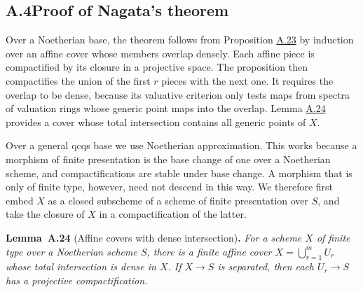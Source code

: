 \documentclass[11pt]{article}
\newenvironment{bpstatement}[2]{\par\addvspace{0.6\baselineskip}\noindent\textbf{#1}#2\textbf{.}\enspace\ignorespaces}
  {\par\addvspace{0.4\baselineskip}}
\newenvironment{bpstatementit}[2]{\begin{bpstatement}{#1}{#2}\itshape\ignorespaces}{\end{bpstatement}}
\begin{document}
\subsection*{\texorpdfstring{A.4\quad Proof of Nagata's theorem}{A.4 Proof of Nagata's theorem}}
\label{bp63}%
\label{bp64}%
Over a Noetherian base, the theorem follows from Proposition \hyperref[bp61]{A.23} by induction over an affine cover whose members overlap densely. Each affine piece is compactified by its closure in a projective space. The proposition then compactifies the union of the first \(r\) pieces with the next one. It requires the overlap to be dense, because its valuative criterion only tests maps from spectra of valuation rings whose generic point maps into the overlap. Lemma \hyperref[bp65]{A.24} provides a cover whose total intersection contains all generic points of \(X\).

Over a general qcqs base we use Noetherian approximation. This works because a morphism of finite presentation is the base change of one over a Noetherian scheme, and compactifications are stable under base change. A morphism that is only of finite type, however, need not descend in this way. We therefore first embed \(X\) as a closed subscheme of a scheme of finite presentation over \(S\), and take the closure of \(X\) in a compactification of the latter.

\label{bp65}%
\begin{bpstatementit}{Lemma~A.24}{ (Affine covers with dense intersection)}
For a scheme \(X\) of finite type over a Noetherian scheme \(S\), there is a finite affine cover \(X=\bigcup_{r=1}^m U_r\) whose total intersection is dense in \(X\). If \(X\to S\) is separated, then each \(U_r\to S\) has a projective compactification.
\end{bpstatementit}
\end{document}
